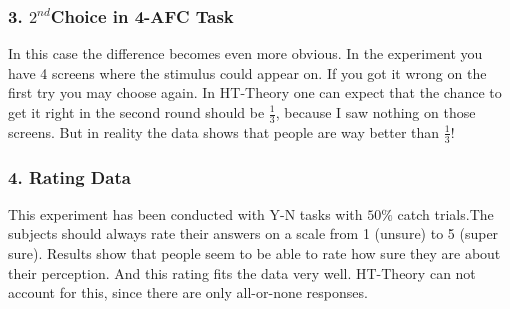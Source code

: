 \documentclass[../main/Notes.tex]{subfiles}
\begin{document}
\subsubsection*{3. $2^{nd}$Choice in 4-AFC Task}
In this case the difference becomes even more obvious. In the experiment you have 4 screens where the stimulus could appear on. If you got it wrong on the first try you may choose again. In HT-Theory one can expect that the chance to get it right in the second round should be $\frac{1}{3}$, because I saw nothing on those screens. But in reality the data shows that people are way better than $\frac{1}{3}$!  
\subsubsection*{4. Rating Data}
This experiment has been conducted with Y-N tasks with $50\%$ catch trials.The subjects should always rate their answers on a scale from 1 (unsure) to 5 (super sure). Results show that people seem to be able to rate how sure they are about their perception. And this rating fits the data very well. HT-Theory can not account for this, since there are only all-or-none responses.
\end{document}
